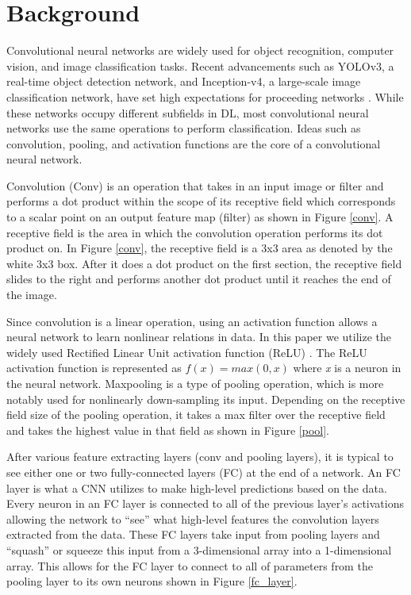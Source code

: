 \documentclass{osa-article}
\begin{document}
\section{Background}
Convolutional neural networks are widely used for object recognition, computer vision, and image classification tasks. Recent advancements such as YOLOv3, a real-time object detection network, and Inception-v4, a large-scale image classification network, have set high expectations for proceeding networks \cite{DBLP:journals/corr/abs-1804-02767, DBLP:journals/corr/SzegedyIV16}. While these networks occupy different subfields in DL, most convolutional neural networks use the same operations to perform classification. Ideas such as convolution, pooling, and activation functions are the core of a convolutional neural network. \par
Convolution (Conv) is an operation that takes in an input image or filter and performs a dot product within the scope of its receptive field which corresponds to a scalar point on an output feature map (filter) as shown in Figure \ref{conv}. A receptive field is the area in which the convolution operation performs its dot product on. In Figure \ref{conv}, the receptive field is a 3x3 area as denoted by the white 3x3 box. After it does a dot product on the first section, the receptive field slides to the right and performs another dot product until it reaches the end of the image.\par
Since convolution is a linear operation, using an activation function allows a neural network to learn nonlinear relations in data. In this paper we utilize the widely used Rectified Linear Unit activation function (ReLU) \cite{Nair:2010:RLU:3104322.3104425}. The ReLU activation function is represented as $f(x) = max(0, x) $ where \textit{x} is a neuron in the neural network. Maxpooling is a type of pooling operation, which is more notably used for nonlinearly down-sampling its input. Depending on the receptive field size of the pooling operation, it takes a max filter over the receptive field and takes the highest value in that field as shown in Figure \ref{pool}. \par
After various feature extracting layers (conv and pooling layers), it is typical to see either one or two fully-connected layers (FC) at the end of a network. An FC layer is what a CNN utilizes to make high-level predictions based on the data. Every neuron in an FC layer is connected to all of the previous layer's activations allowing the network to ``see'' what high-level features the convolution layers extracted from the data. These FC layers take input from pooling layers and ``squash'' or squeeze this input from a 3-dimensional array into a 1-dimensional array. This allows for the FC layer to connect to all of parameters from the pooling layer to its own neurons shown in Figure \ref{fc_layer}.\par
\end{document}
